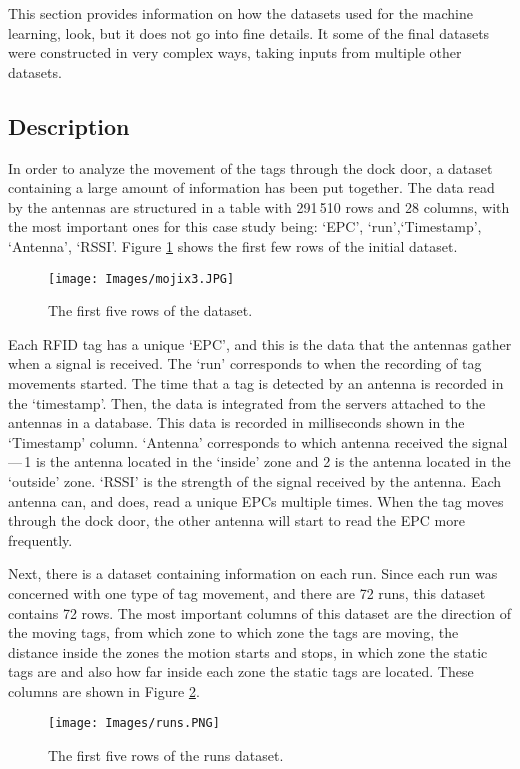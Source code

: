 \documentclass{article}
\begin{document}
This section provides information on how the datasets used for the machine learning, look, but it does not go into fine details.
It some of the final datasets were constructed in very complex ways, taking inputs from multiple other datasets.

\subsection{Description}

In order to analyze the movement of the tags through the dock door, a dataset containing a large amount of information has been put together.
The data read by the antennas are structured in a table with 291\,510 rows and 28 columns, with the most important ones for this case study being: `\ac{EPC}', `run',`Timestamp', `Antenna', `\ac{RSSI}'.
Figure \ref{fig:init_data} shows the first few rows of the initial dataset.
%
\begin{figure}[h]
    \centering
    \texttt{[image: Images/mojix3.JPG]}
    \caption{The first five rows of the dataset.}
    \label{fig:init_data}
\end{figure}
%
Each \ac{RFID} tag has a unique `\ac{EPC}', and this is the data that the antennas gather when a signal is received.
The `run' corresponds to when the recording of tag movements started.
The time that a tag is detected by an antenna is recorded in the `timestamp'.
Then, the data is integrated from the servers attached to the antennas in a database. 
This data is recorded in milliseconds shown in the `Timestamp' column.
`Antenna' corresponds to which antenna received the signal\,---\,1 is the antenna located in the `inside' zone and 2 is the antenna located in the `outside' zone. 
`\ac{RSSI}' is the strength of the signal received by the antenna.
Each antenna can, and does, read a unique \ac{EPC}s multiple times.
When the tag moves through the dock door, the other antenna will start to read the \ac{EPC} more frequently.

Next, there is a dataset containing information on each run.
Since each run was concerned with one type of tag movement, and there are 72 runs, this dataset contains 72 rows. 
The most important columns of this dataset are the direction of the moving tags, from which zone to which zone the tags are moving, the distance inside the zones the motion starts and stops, in which zone the static tags are and also how far inside each zone the static tags are located.
These columns are shown in Figure \ref{fig:runs_data}.
%
\begin{figure}[h]
    \centering
    \texttt{[image: Images/runs.PNG]}
    \caption{The first five rows of the runs dataset.}
    \label{fig:runs_data}
\end{figure}
%
\end{document}
